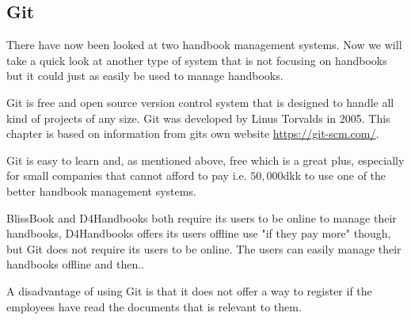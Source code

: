 \subsection{Git}
There have now been looked at two handbook management systems. Now we will take a quick look at another type of system that is not focusing on handbooks but it could just as easily be used to manage handbooks.

Git is free and open source version control system that is designed to handle all kind of projects of any size. Git was developed by Linus Torvalds in 2005. This chapter is based on information from gits own website \url{https://git-scm.com/}.

Git is easy to learn and, as mentioned above, free which is a great plus, especially for small companies that cannot afford to pay i.e. $50,000$dkk
 to use one of the better handbook management systems.

BlissBook and D4Handbooks both require its users to be online to manage their handbooks, D4Handbooks offers its users offline use "if they pay more" though, but Git does not require its users to be online. The users can easily manage their handbooks offline and then.. %

A disadvantage of using Git is that it does not offer a way to register if the employees have read the documents that is relevant to them.
